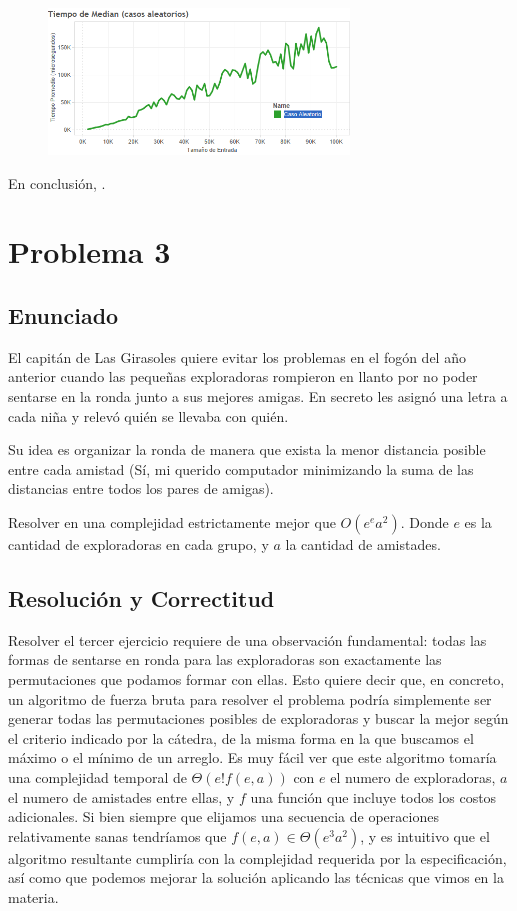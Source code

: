 \documentclass{article}
\theoremstyle{definition}
\theoremstyle{remark}
\begin{document}
\begin{figure}[h!]
\centering
\label{grf:ex2-random}
\includegraphics[width=8cm]{images/ex2-random}
\caption{}
\end{figure}


En conclusión, .

\pagebreak

\section{Problema 3}

\subsection{Enunciado}

El capitán de Las Girasoles quiere evitar los problemas en el fogón del año anterior cuando las pequeñas exploradoras rompieron en llanto por no poder sentarse en la ronda junto a sus mejores amigas. En secreto les asignó una letra a cada niña y relevó quién se llevaba con quién.

Su idea es organizar la ronda de manera que exista la menor distancia posible entre cada amistad (Sí, mi querido computador minimizando la suma de las distancias entre todos los pares de amigas).

Resolver en una complejidad estrictamente mejor que $O(e^e a^2)$. Donde $e$ es la cantidad de exploradoras en cada grupo, y $a$ la cantidad de amistades.

\subsection{Resolución y Correctitud}

Resolver el tercer ejercicio requiere de una observación fundamental: todas las formas de sentarse en ronda para las exploradoras son exactamente las permutaciones que podamos formar con ellas. Esto quiere decir que, en concreto, un algoritmo de fuerza bruta para resolver el problema podría simplemente ser generar todas las permutaciones posibles de exploradoras y buscar la mejor según el criterio indicado por la cátedra, de la misma forma en la que buscamos el máximo o el mínimo de un arreglo. Es muy fácil ver que este algoritmo tomaría una complejidad temporal de $\Theta(e! f(e, a))$ con $e$ el numero de exploradoras, $a$ el numero de amistades entre ellas, y $f$ una función que incluye todos los costos adicionales. Si bien siempre que elijamos una secuencia de operaciones relativamente sanas tendríamos que $f(e, a) \in \Theta(e^3 a^2)$, y es intuitivo que el algoritmo resultante cumpliría con la complejidad requerida por la especificación, así como que podemos mejorar la solución aplicando las técnicas que vimos en la materia.
\end{document}
